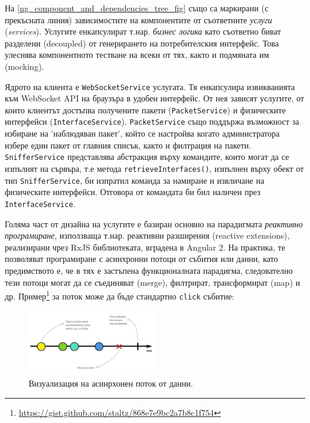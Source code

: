 \documentclass[12pt,a4paper,oneside]{book}
\begin{document}
На \autoref{ng_component_and_dependencies_tree_fig} също са маркирани
(с прекъсната линия) зависимостите на компонентите от съответните
\textit{услуги} (\textit{services}). Услугите енкапсулират т.нар.
\textit{бизнес логика} като съответно биват разделени (decoupled) от
генерирането на потребителския интерфейс. Това улеснява компонентното тестване
на всеки от тях, както и подмяната им (mocking).

Ядрото на клиента е \texttt{WebSocketService} услугата. Тя енкапсулира
извикванията към WebSocket API на браузъра в удобен интерфейс. От нея зависят
услугите, от които клиентът достъпва получените пакети (\texttt{PacketService}) и
физическите интерфейси (\texttt{InterfaceService}). \texttt{PacketService} също поддържа
възможност за избиране на 'наблюдяван пакет', който се настройва
когато администратора избере един пакет от главния списък, както и филтрация на пакети. \texttt{SnifferService}
представлява абстракция върху командите, които могат да се изпълнят на сървъра,
т.е метода \texttt{retrieveInterfaces()}, изпълнен върху обект от тип
\texttt{SnifferService}, би изпратил команда за намиране и извличане на
физическите интерфейси. Отговора от командата би бил наличен през
\texttt{InterfaceService}.

Голяма част от дизайна на услугите е базиран основно на
парадигмата \textit{реактивно програмиране}, използваща т.нар.
реактивни разширения (reactive extensions), реализирани чрез
RxJS библиотеката, вградена в Angular 2. На практика,
те позволяват програмиране с асинхронни потоци от събития или данни,
като предимството е, че в тях е застъпена функционалната парадигма,
следователно тези потоци могат да се съединяват (merge), филтрират,
трансформират (map) и др.
Пример\footnote{\url{https://gist.github.com/staltz/868e7e9bc2a7b8c1f754}} за поток може да бъде стандартно \texttt{click}
събитие:

\begin{figure}[h!]
  \centering
  \includegraphics[width=0.5\textwidth]{figures/observable.png}
  \caption{Визуализация на асинрхонен поток от данни.}
  \label{observable_fig}
\end{figure}
\end{document}
